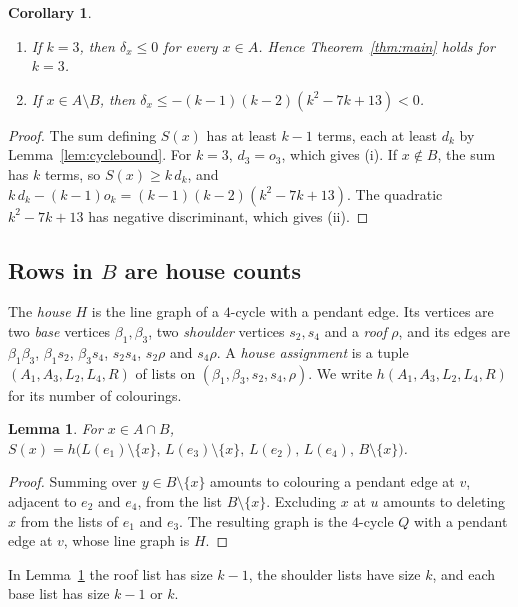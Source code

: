 \documentclass[11pt]{amsart}
\newtheorem{lemma}[theorem]{Lemma}
\newtheorem{corollary}[theorem]{Corollary}
\theoremstyle{definition}
\theoremstyle{remark}
\newcommand{\1}{\mathbf 1}
\begin{document}
\begin{corollary}\label{cor:easy}
\begin{enumerate}[label=(\roman*)]
\item If $k=3$, then $\delta_x\le 0$ for every $x\in A$. Hence Theorem~\ref{thm:main} holds for $k=3$.
\item If $x\in A\setminus B$, then $\delta_x\le -(k-1)(k-2)(k^2-7k+13)<0$.
\end{enumerate}
\end{corollary}
\begin{proof}
The sum defining $S(x)$ has at least $k-1$ terms, each at least $d_k$ by Lemma~\ref{lem:cyclebound}.
For $k=3$, $d_3=o_3$, which gives (i). If $x\notin B$, the sum has $k$ terms, so
$S(x)\ge k\,d_k$, and $k\,d_k-(k-1)o_k=(k-1)(k-2)(k^2-7k+13)$. The quadratic $k^2-7k+13$ has negative
discriminant, which gives (ii).
\end{proof}

\subsection{\texorpdfstring{Rows in $B$ are house counts}{Rows in B are house counts}}
The \emph{house} $H$ is the line graph of a $4$-cycle with a pendant edge. Its vertices are two
\emph{base} vertices $\beta_1,\beta_3$, two \emph{shoulder} vertices $s_2,s_4$ and a \emph{roof} $\rho$,
and its edges are $\beta_1\beta_3$, $\beta_1s_2$, $\beta_3s_4$, $s_2s_4$, $s_2\rho$ and $s_4\rho$.
A \emph{house assignment} is a tuple $(A_1,A_3,L_2,L_4,R)$ of lists on
$(\beta_1,\beta_3,s_2,s_4,\rho)$. We write $h(A_1,A_3,L_2,L_4,R)$ for its number of colourings.

\begin{lemma}\label{lem:rowhouse}
For $x\in A\cap B$, $S(x)=h\bigl(L(e_1)\setminus\{x\},\,L(e_3)\setminus\{x\},\,L(e_2),\,L(e_4),\,B\setminus\{x\}\bigr)$.
\end{lemma}
\begin{proof}
Summing over $y\in B\setminus\{x\}$ amounts to colouring a pendant edge at $v$, adjacent to $e_2$ and
$e_4$, from the list $B\setminus\{x\}$. Excluding $x$ at $u$ amounts to deleting $x$ from the lists of
$e_1$ and $e_3$. The resulting graph is the $4$-cycle $Q$ with a pendant edge at $v$, whose line graph
is $H$.
\end{proof}

In Lemma~\ref{lem:rowhouse} the roof list has size $k-1$, the shoulder lists have size $k$, and each
base list has size $k-1$ or $k$.
\end{document}
